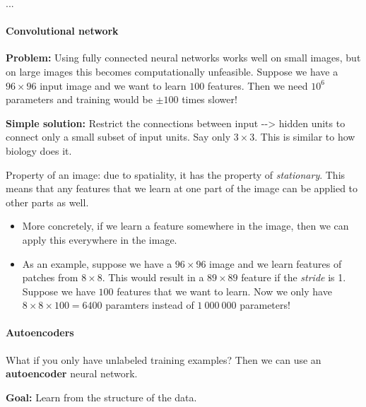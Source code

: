 \documentclass[]{article}
\let\oldparagraph\paragraph
\renewcommand{\paragraph}[1]{\oldparagraph{#1}\mbox{}}
\begin{document}
...

\paragraph{Convolutional network}\label{header-n326}

\textbf{Problem:} Using fully connected neural networks works well on
small images, but on large images this becomes computationally
unfeasible. Suppose we have a \(96 \times 96\) input image and we want
to learn \(100\) features. Then we need \(10^6\) parameters and training
would be \(\pm100\) times slower!

\textbf{Simple solution:} Restrict the connections between input
-\/-\textgreater{} hidden units to connect only a small subset of input
units. Say only \(3 \times 3\). This is similar to how biology does it.

Property of an image: due to spatiality, it has the property of
\emph{stationary}. This means that any features that we learn at one
part of the image can be applied to other parts as well.

\begin{itemize}
\item
  More concretely, if we learn a feature somewhere in the image, then we
  can apply this everywhere in the image.
\end{itemize}

\begin{itemize}
\item
  As an example, suppose we have a \(96\times 96\) image and we learn
  features of patches from \(8 \times 8\). This would result in a
  \(89 \times 89\) feature if the \emph{stride} is 1. Suppose we have
  \(100\) features that we want to learn. Now we only have
  \(8 \times 8 \times 100 = 6400\) paramters instead of \(1\ 000\ 000\)
  parameters!
\end{itemize}

\paragraph{Autoencoders}\label{header-n341}

What if you only have unlabeled training examples? Then we can use an
\textbf{autoencoder} neural network.

\textbf{Goal:} Learn from the structure of the data.
\end{document}
